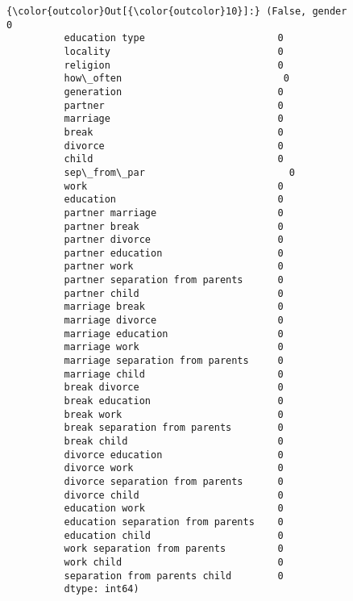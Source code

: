 \documentclass[11pt]{article}
\begin{document}
\begin{Verbatim}[commandchars=\\\{\}]
{\color{outcolor}Out[{\color{outcolor}10}]:} (False, gender                               0
          education type                       0
          locality                             0
          religion                             0
          how\_often                            0
          generation                           0
          partner                              0
          marriage                             0
          break                                0
          divorce                              0
          child                                0
          sep\_from\_par                         0
          work                                 0
          education                            0
          partner marriage                     0
          partner break                        0
          partner divorce                      0
          partner education                    0
          partner work                         0
          partner separation from parents      0
          partner child                        0
          marriage break                       0
          marriage divorce                     0
          marriage education                   0
          marriage work                        0
          marriage separation from parents     0
          marriage child                       0
          break divorce                        0
          break education                      0
          break work                           0
          break separation from parents        0
          break child                          0
          divorce education                    0
          divorce work                         0
          divorce separation from parents      0
          divorce child                        0
          education work                       0
          education separation from parents    0
          education child                      0
          work separation from parents         0
          work child                           0
          separation from parents child        0
          dtype: int64)
\end{Verbatim}
            
\end{document}
